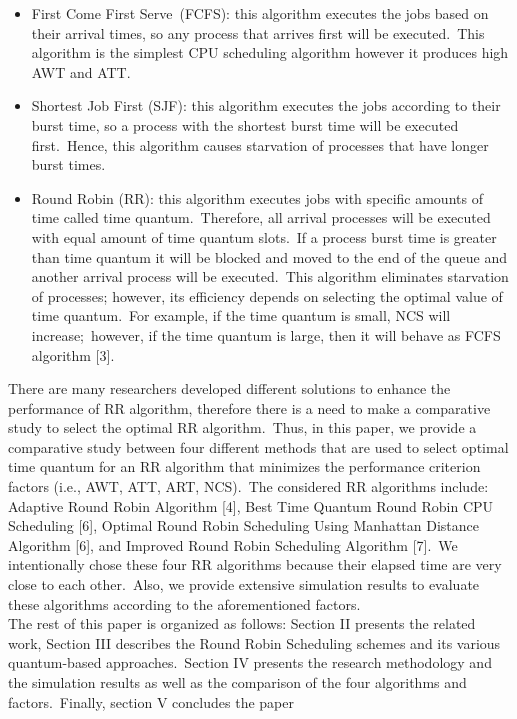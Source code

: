 \begin{itemize}
    \item First Come First Serve~(FCFS): this algorithm executes
    the jobs based on their arrival times, so any process
    that arrives first will be executed.~This algorithm is the
    simplest CPU scheduling algorithm however it produces
    high AWT and ATT.\@
    \item Shortest Job First (SJF): this algorithm executes the jobs
    according to their burst time, so a process with the
    shortest burst time will be executed first.~Hence, this
    algorithm causes starvation of processes that have longer
    burst times.
    \item Round Robin (RR): this algorithm executes jobs with
    specific amounts of time called time quantum.~Therefore,
    all arrival processes will be executed with equal amount
    of time quantum slots.~If a process burst time is greater
    than time quantum it will be blocked and moved to the
    end of the queue and another arrival process will be
    executed.~This algorithm eliminates starvation of processes;
    however, its efficiency depends on selecting the optimal
    value of time quantum.~For example, if the time quantum
    is small, NCS will increase;~however, if the time quantum
    is large, then it will behave as FCFS algorithm [3].
\end{itemize}

\vspace{1em}

There are many researchers developed different solutions
to enhance the performance of RR algorithm, therefore there
is a need to make a comparative study to select the optimal
RR algorithm.~Thus, in this paper, we provide a comparative
study between four different methods that are used to select
optimal time quantum for an RR algorithm that minimizes
the performance criterion factors (i.e., AWT, ATT, ART,
NCS).~The considered RR algorithms include: Adaptive Round
Robin Algorithm [4], Best Time Quantum Round Robin CPU
Scheduling [6], Optimal Round Robin Scheduling Using
Manhattan Distance Algorithm [6], and Improved Round Robin
Scheduling Algorithm [7].~We intentionally chose these four
RR algorithms because their elapsed time are very close to
each other.~Also, we provide extensive simulation results to
evaluate these algorithms according to the aforementioned
factors.\\

The rest of this paper is organized as follows: Section II
presents the related work, Section III describes the Round
Robin Scheduling schemes and its various quantum-based
approaches.~Section IV presents the research methodology and
the simulation results as well as the comparison of the four
algorithms and factors.~Finally, section V concludes the paper